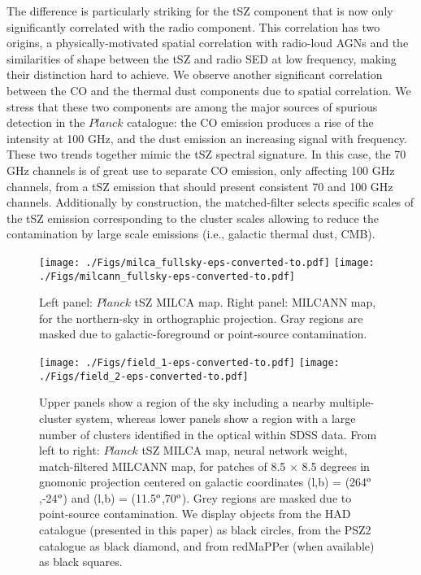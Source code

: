 \documentclass[traditabstract,a4,twocolumn]{aa}
\begin{document}
The difference is particularly striking for the tSZ component that is now only significantly correlated with the radio component. This correlation has two origins, a physically-motivated spatial correlation with radio-loud AGNs and the similarities of shape between the tSZ and radio SED at low frequency, making their distinction hard to achieve. We observe another significant correlation between the CO and the thermal dust components due to spatial correlation. We stress that these two components are among the major sources of spurious detection in the {\it $Planck$} catalogue: the CO emission produces a rise of the intensity at 100 GHz, and the dust emission an increasing signal with frequency. These two trends together mimic the tSZ spectral signature. In this case, the 70 GHz channels is of great use to separate CO emission, only affecting 100 GHz channels, from a tSZ emission that should present consistent 70 and 100 GHz channels.
Additionally by construction, the matched-filter selects specific scales of the tSZ emission corresponding to the cluster scales allowing to reduce the contamination by large scale emissions (i.e., galactic thermal dust, CMB). 


\begin{figure*}[!th]
\center
\texttt{[image: ./Figs/milca\_fullsky-eps-converted-to.pdf]}
\texttt{[image: ./Figs/milcann\_fullsky-eps-converted-to.pdf]}\\
\caption{Left panel: $Planck$ tSZ MILCA map. Right panel: MILCANN map, for the northern-sky in orthographic projection. Gray regions are masked due to galactic-foreground or point-source contamination.}
\label{fullsignal}
\end{figure*}


\begin{figure*}[!th]
\center
\texttt{[image: ./Figs/field\_1-eps-converted-to.pdf]}
\texttt{[image: ./Figs/field\_2-eps-converted-to.pdf]}
\caption{ Upper panels show a region of the sky including a nearby multiple-cluster system, whereas lower panels show a region with a large number of clusters identified in the optical within SDSS data.
From left to right: $Planck$ tSZ MILCA map, neural network weight, match-filtered MILCANN map, for patches of 8.5 $\times$ 8.5 degrees in gnomonic projection centered on galactic coordinates (l,b) = (264$^{\rm o}$,-24$^{\rm o}$) and (l,b) = (11.5$^{\rm o}$,70$^{\rm o}$). Grey regions are masked due to point-source contamination. We display objects from the HAD catalogue (presented in this paper) as black circles, from the PSZ2 catalogue as black diamond, and from redMaPPer (when available) as black squares.
}
\label{patchsignal}
\end{figure*}
\end{document}
